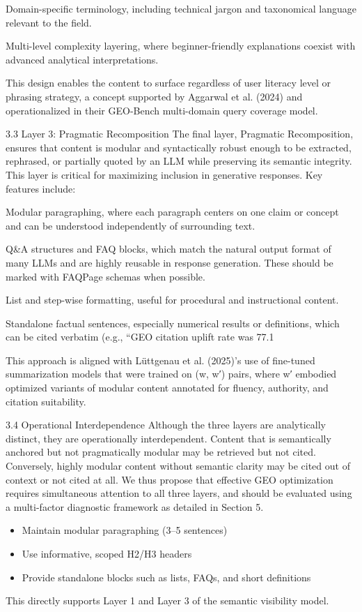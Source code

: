 Domain-specific terminology, including technical jargon and taxonomical language relevant to the field.

Multi-level complexity layering, where beginner-friendly explanations coexist with advanced analytical interpretations.

This design enables the content to surface regardless of user literacy level or phrasing strategy, a concept supported by Aggarwal et al. (2024) and operationalized in their GEO-Bench multi-domain query coverage model.

3.3 Layer 3: Pragmatic Recomposition
The final layer, Pragmatic Recomposition, ensures that content is modular and syntactically robust enough to be extracted, rephrased, or partially quoted by an LLM while preserving its semantic integrity. This layer is critical for maximizing inclusion in generative responses. Key features include:

Modular paragraphing, where each paragraph centers on one claim or concept and can be understood independently of surrounding text.

Q&A structures and FAQ blocks, which match the natural output format of many LLMs and are highly reusable in response generation. These should be marked with FAQPage schemas when possible.

List and step-wise formatting, useful for procedural and instructional content.

Standalone factual sentences, especially numerical results or definitions, which can be cited verbatim (e.g., “GEO citation uplift rate was 77.1%

This approach is aligned with Lüttgenau et al. (2025)’s use of fine-tuned summarization models that were trained on (w, w′) pairs, where w′ embodied optimized variants of modular content annotated for fluency, authority, and citation suitability.

3.4 Operational Interdependence
Although the three layers are analytically distinct, they are operationally interdependent. Content that is semantically anchored but not pragmatically modular may be retrieved but not cited. Conversely, highly modular content without semantic clarity may be cited out of context or not cited at all. We thus propose that effective GEO optimization requires simultaneous attention to all three layers, and should be evaluated using a multi-factor diagnostic framework as detailed in Section 5.
\begin{itemize}
  \item Maintain modular paragraphing (3--5 sentences)
  \item Use informative, scoped H2/H3 headers
  \item Provide standalone blocks such as lists, FAQs, and short definitions
\end{itemize}
This directly supports Layer 1 and Layer 3 of the semantic visibility model.

